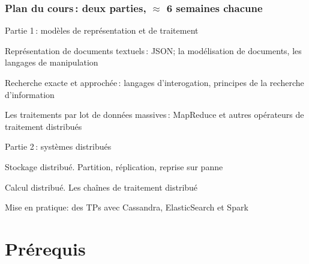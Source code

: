\begin{frame}
\frametitle{Plan du cours\,: deux parties, $\approx$ 6 semaines chacune}

\alert{Partie 1}\,: modèles de représentation et de traitement

\begin{redbullet}
  \item \alert{Représentation de documents textuels}\,: JSON; la modélisation
    de documents, les langages 
     de manipulation

  \item \alert{Recherche exacte et approchée}\,:  langages d'interogation,
      principes de la recherche d'information

  \item \alert{Les traitements par lot de données massives}\,:  MapReduce et autres
          opérateurs de traitement distribués
 \end{redbullet}

\alert{Partie 2}\,: systèmes distribués
 
\begin{redbullet}    
   \item \alert{Stockage distribué}. Partition, réplication, reprise sur panne
   
   \item \alert{Calcul distribué}. Les chaînes de traitement distribué
\end{redbullet}

\vfill
Mise en pratique: des TPs avec Cassandra, ElasticSearch et Spark

\end{frame}


\section{Prérequis}

